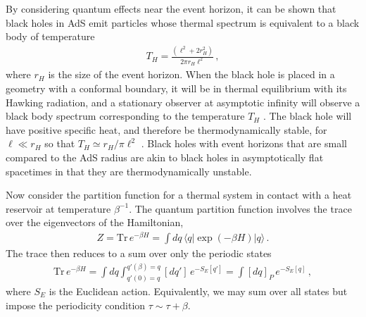 \documentclass[../PhD.tex]{subfiles}
\begin{document}
By considering quantum effects near the event horizon, it can be shown that black holes in AdS emit particles whose thermal spectrum is equivalent to a black body of temperature \cite{Hawking:1974rv, Hawking:1974sw}
\begin{align}
\label{hawking temp}
T_H = \frac{(\ell^2 + 2r_H^2)}{2 \pi r_H \ell^2} \, ,
\end{align}
where $r_H$ is the size of the event horizon. When the black hole is placed in a geometry with a conformal boundary, it will be in thermal equilibrium with its Hawking radiation, and a stationary observer at asymptotic infinity will observe a black body spectrum corresponding to the temperature $T_H$ \cite{Carroll:2004st}. The black hole will have positive specific heat, and therefore be thermodynamically stable, for $\ell \ll r_H$ so that $T_H \simeq r_H/ \pi \ell^2$ \cite{Hawking:1982dh}. Black holes with event horizons that are small compared to the AdS radius are akin to black holes in asymptotically flat spacetimes in that they are thermodynamically unstable.

Now consider the partition function for a thermal system in contact with a heat reservoir at temperature $\beta^{-1}$. The quantum partition function involves the trace over the eigenvectors of the Hamiltonian,
\begin{align}
\label{quantum par}
Z = \text{Tr} \, e^{- \beta H} = \int dq \, \langle q | \exp ( - \beta H ) | q \rangle \, .
\end{align}
The trace then reduces to a sum over only the periodic states \cite{Schellekens}
\begin{align}
\label{cft trace}
\text{Tr} \, e^{ - \beta H} = \int dq \int^{q'(\beta)=q}_{q'(0)=q} [dq'] \, e^{-S_E[q']} = \int [dq]_P \, e^{-S_E[q]} \, ,
\end{align}
where $S_E$ is the Euclidean action. Equivalently, we may sum over all states but impose the periodicity condition $\tau \sim \tau + \beta$. 
\end{document}
